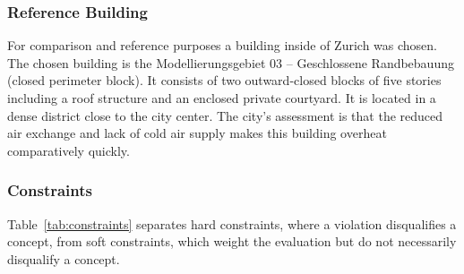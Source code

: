 \subsubsection{Reference Building}
\label{sec:refbuilding}

For comparison and reference purposes a building inside of Zurich was chosen. The chosen
building is the Modellierungsgebiet 03 -- Geschlossene Randbebauung (closed perimeter
block). It consists of two outward-closed blocks of five stories including a roof
structure and an enclosed private courtyard. It is located in a dense district close to
the city center. The city's assessment is that the reduced air exchange and lack of cold
air supply makes this building overheat comparatively quickly.

\subsubsection{Constraints}
\label{sec:constraints}

Table~\ref{tab:constraints} separates hard constraints, where a violation disqualifies a
concept, from soft constraints, which weight the evaluation but do not necessarily
disqualify a concept.

